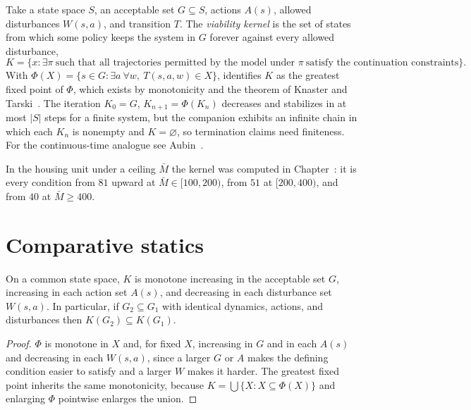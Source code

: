 Take a state space $S$, an acceptable set $G\subseteq S$, actions $A(s)$, allowed disturbances $W(s,a)$, and transition $T$. The \emph{viability kernel} is the set of states from which some policy keeps the system in $G$ forever against every allowed disturbance,
\[
K=\bigl\{x:\exists\pi\ \text{such that all trajectories permitted by the model under }\pi\ \text{satisfy the continuation constraints}\bigr\}.
\]
With $\Phi(X)=\{s\in G:\exists a\ \forall w,\ T(s,a,w)\in X\}$,  identifies $K$ as the greatest fixed point of $\Phi$, which exists by monotonicity and the theorem of Knaster and Tarski~\cite{tarski1955}. The iteration $K_0=G$, $K_{n+1}=\Phi(K_n)$ decreases and stabilizes in at most $|S|$ steps for a finite system, but the companion exhibits an infinite chain in which each $K_n$ is nonempty and $K=\varnothing$, so termination claims need finiteness. For the continuous-time analogue see Aubin~\cite{aubin1991}.

In the housing unit under a ceiling $\bar M$ the kernel was computed in Chapter~: it is every condition from $81$ upward at $\bar M\in[100,200)$, from $51$ at $[200,400)$, and from $40$ at $\bar M\ge 400$.

\section{Comparative statics}

\begin{theorem}\label{thm:P23}
On a common state space, $K$ is monotone increasing in the acceptable set $G$, increasing in each action set $A(s)$, and decreasing in each disturbance set $W(s,a)$. In particular, if $G_2\subseteq G_1$ with identical dynamics, actions, and disturbances then $K(G_2)\subseteq K(G_1)$.
\end{theorem}

\begin{proof}
$\Phi$ is monotone in $X$ and, for fixed $X$, increasing in $G$ and in each $A(s)$ and decreasing in each $W(s,a)$, since a larger $G$ or $A$ makes the defining condition easier to satisfy and a larger $W$ makes it harder. The greatest fixed point inherits the same monotonicity, because $K=\bigcup\{X:X\subseteq\Phi(X)\}$ and enlarging $\Phi$ pointwise enlarges the union.
\end{proof}

